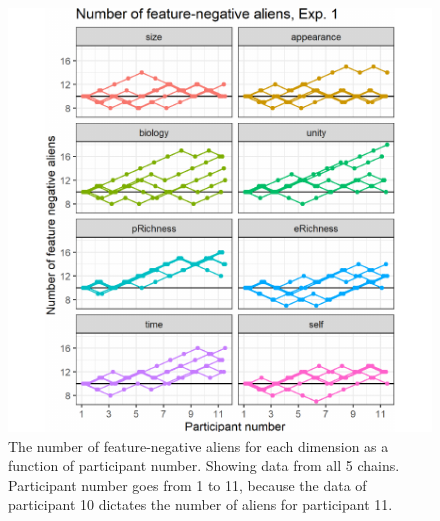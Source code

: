 \documentclass[10pt, letterpaper]{article}
\newenvironment{CodeChunk}{}{}
\begin{document}
\begin{CodeChunk}
\begin{figure}[H]

{\centering \includegraphics{figs/mwjplot1-1} 

}

\caption[The number of feature-negative aliens for each dimension as a function of participant number]{The number of feature-negative aliens for each dimension as a function of participant number. Showing data from all 5 chains. Participant number goes from 1 to 11, because the data of participant 10 dictates the number of aliens for participant 11.}\label{fig:mwjplot1}
\end{figure}
\end{CodeChunk}
\end{document}
